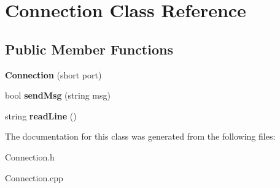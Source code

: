 \hypertarget{classConnection}{\section{Connection Class Reference}
\label{classConnection}
}
\subsection*{Public Member Functions}
\begin{DoxyCompactItemize}
\item 
\hypertarget{classConnection_a8089476d48ba545f44e691cd4bd0278d}{{\bfseries Connection} (short port)}\label{classConnection_a8089476d48ba545f44e691cd4bd0278d}

\item 
\hypertarget{classConnection_a4b9f6db1fb42fc9857f829fa0bc52e6e}{bool {\bfseries send\-Msg} (string msg)}\label{classConnection_a4b9f6db1fb42fc9857f829fa0bc52e6e}

\item 
\hypertarget{classConnection_a1df16b436751b686d96c24ca0c498659}{string {\bfseries read\-Line} ()}\label{classConnection_a1df16b436751b686d96c24ca0c498659}

\end{DoxyCompactItemize}


The documentation for this class was generated from the following files\-:\begin{DoxyCompactItemize}
\item 
Connection.\-h\item 
Connection.\-cpp\end{DoxyCompactItemize}

